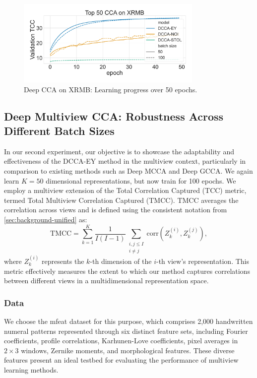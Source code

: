 \begin{figure}
    \centering
    \includegraphics[width=0.8\textwidth]{figures/DCCA/XRMB_allbatchsizes_pcc}
    \caption{Deep CCA on XRMB: Learning progress over 50 epochs.}
    \label{fig:lr_xrmb}
\end{figure}

\subsection{Deep Multiview CCA: Robustness Across Different Batch Sizes}
In our second experiment, our objective is to showcase the adaptability and effectiveness of the DCCA-EY method in the multiview context, particularly in comparison to existing methods such as Deep MCCA and Deep GCCA.
We again learn $K=50$ dimensional representations, but now train for 100 epochs.
We employ a multiview extension of the Total Correlation Captured (TCC) metric, termed Total Multiview Correlation Captured (TMCC). TMCC averages the correlation across views and is defined using the consistent notation from \cref{sec:background-unified} as:
\[
    \text{TMCC} = \sum_{k=1}^{K} \frac{1}{I(I-1)} \sum_{\substack{i,j \leq I \\ i \neq j}} \text{corr}(Z_k^{(i)}, Z_k^{(j)}),
\]
where \( Z_k^{(i)} \) represents the \( k \)-th dimension of the \( i \)-th view's representation.
This metric effectively measures the extent to which our method captures correlations between different views in a multidimensional representation space.

\subsubsection{Data} We choose the mfeat dataset \citep{misc_multiple_features_72} for this purpose, which comprises 2,000 handwritten numeral patterns represented through six distinct feature sets, including Fourier coefficients, profile correlations, Karhunen-Love coefficients, pixel averages in \(2 \times 3\) windows, Zernike moments, and morphological features.
These diverse features present an ideal testbed for evaluating the performance of multiview learning methods.


